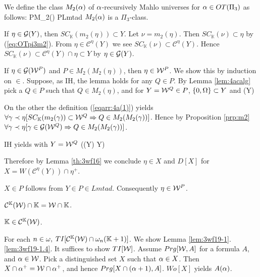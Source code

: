 \documentclass{article}
\newcommand{\mK}{\mathbb{K}}
\begin{document}
\bdf\label{df:UVM}
{\rm 
We define the class $M_{2}(\alpha)$ of $\alpha$-recursively Mahlo universes for 
$\alpha\in OT(\Pi_{3})$ as follows:
\beqn\label{eqarr:4a(1)}
 P\in M_{2}(\alp) \Lrarw 
 P\in Lmtad \spand 
 \fal\bet\prec\alp
 [
SC_{\mK}(m_{2}(\bet))\subset\calw^{P}
 \Rarw P\in M_{2}(M_{2}(\bet))] 
\eeqn
$M_{2}(\alpha)$ is a $\Pi_{3}$-class.


}
\edf




\bprp\label{prp:m2}
If $\eta\in{\cal G}(Y)$, then $SC_{\mK}(m_{2}(\eta))\subset Y$.
\eprp
\bprf
Let $\nu=m_{2}(\eta)$. 
Then $SC_{\mK}(\nu)\subset\eta$ by (\ref{eq:OTpi3m2}).
From $\eta\in\mathcal{C}^{\eta}(Y)$ we see $SC_{\mK}(\nu)\subset\mathcal{C}^{\eta}(Y)$.
Hence $SC_{\mK}(\nu)\subset\mathcal{C}^{\eta}(Y)\cap\eta\subset Y$ by $\eta\in{\cal G}(Y)$.
\eprf


\blem\label{lem:3awf16.1} 
If $\eta\in{\cal G}({\cal W}^{P})$
and $P\in M_{2}(M_{2}(\eta))$, 
then $\eta\in{\cal W}^{P}$.
\elem
\bprf 
We show this by induction on $\in$. Suppose, as IH, the lemma holds for any $Q\in P$.
By Lemma \ref{lem:4acalg} pick a $Q\in P$ such that $Q\in M_{2}(\eta)$, and for $Y={\cal W}^{Q}\in P$,
$\{0,\Omega\}\subset Y$ and
\beqn\renewcommand{\theequation}{\ref{eq:3wf16hyp.132}} 
\eta\in\calg(Y)
\eeqn
\addtocounter{equation}{-1}
On the other the definition (\ref{eqarr:4a(1)}) yields 
$\fal\gam\prec\eta[
SC_{\mK}(m_{2}(\gam))\subset\calw^{Q}
 \Rarw Q\in M_{2}(M_{2}(\gam))]$.
Hence by Proposition \ref{prp:m2}
$\forall\gamma\prec\eta[\gamma\in {\cal G}({\cal W}^{Q}) \Rightarrow  
Q\in M_{2}(M_{2}(\gamma))]$.

IH yields with $Y={\cal W}^{Q}$
\beqn\renewcommand{\theequation}{\ref{eq:3wf16hyp.232}}
\fal\gam\prec\eta(\gam\in\calg(Y) \Rarw  \gam\in Y)
\eeqn
\addtocounter{equation}{-1}
Therefore by Lemma \ref{th:3wf16} we conclude 
$\eta\in X$ and $D[X]$ for $X=W(\mathcal{C}^{\eta}(Y))\cap\eta^{+}$.

$X\in P$ follows from $Y\in P\in Lmtad$. 
Consequently $\eta\in{\cal W}^{P}$.
\eprf



\blem\label{lem:3wf19-1}
\benu

\item 
$\mathcal{C}^{\mK}(\calw)\cap\mK=\calw\cap\mK$.

\label{lem:3wf19-1.1}
\item 
$\mK\in\mathcal{C}^{\mK}(\calw)$.
\label{lem:3wf19-1.2}

\item 
For {\rm each} $n\in\omega,$ 
$TI[\mathcal{C}^{\mK}(\calw)\cap\ome_{n}(\mK+1)]$.
\label{lem:3wf19-1.4}
\eenu
\elem
\bprf
We show Lemma \ref{lem:3wf19-1}.\ref{lem:3wf19-1.4}.
It suffices to show $TI[{\cal W}]$.
Assume $Prg[{\cal W},A]$ for a formula $A$, and $\alpha\in{\cal W}$.
Pick a distinguished set $X$ such that $\alpha\in X$. Then $X\cap\alpha^{+}={\cal W}\cap\alpha^{+}$, and
hence $Prg[X\cap(\alpha+1),A]$. $Wo[X]$ yields $A(\alpha)$.
\eprf
\end{document}

